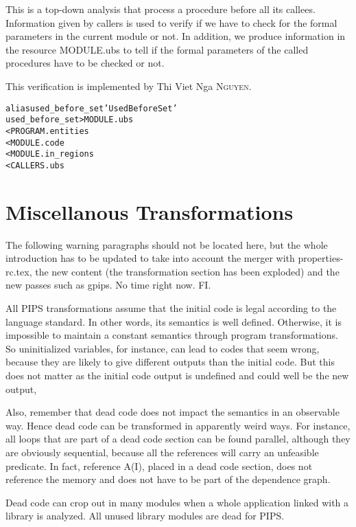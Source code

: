\documentclass[a4paper]{report}
\newenvironment{PipsMake}{\begin{alltt}}{\end{alltt}}
\begin{document}
This is a top-down analysis that process a procedure before all its
callees. Information given by callers is used to verify if we have to
check for the formal parameters in the current module or not. In addition,
we produce information in the resource MODULE.ubs to tell if the formal
parameters of the called procedures have to be checked or not. 

This verification is implemented by Thi Viet Nga \textsc{Nguyen}.

\begin{PipsMake}
alias used_before_set 'Used Before Set'
used_before_set   > MODULE.ubs
        < PROGRAM.entities
        < MODULE.code
        < MODULE.in_regions
        < CALLERS.ubs
\end{PipsMake}


\section{Miscellanous Transformations}

The following warning paragraphs should not be located here, but the
whole introduction has to be updated to take into account the merger
with properties-rc.tex, the new content (the transformation section
has been exploded) and the new passes such as gpips. No time right
now. FI.

All PIPS transformations assume that the initial code is legal
according to the language standard. In other words, its semantics is
well defined. Otherwise, it is impossible to maintain a constant
semantics through program transformations. So uninitialized variables,
for instance, can lead to codes that seem wrong, because they are
likely to give different outputs than the initial code. But this does
not matter as the initial code output is undefined and could well be
the new output,

Also, remember that dead code does not impact the semantics in an
observable way. Hence dead code can be transformed in apparently weird
ways. For instance, all loops that are part of a dead code section can
be found parallel, although they are obviously sequential, because all
the references will carry an unfeasible predicate. In fact, reference
A(I), placed in a dead code section, does not reference the memory and
does not have to be part of the dependence graph.

Dead code can crop out in many modules when a whole application linked
with a library is analyzed. All unused library modules are dead for
PIPS.
\end{document}
